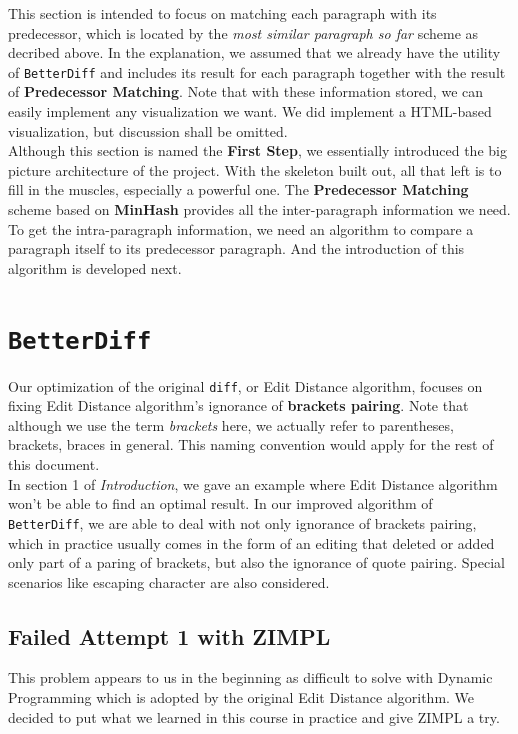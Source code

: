 \documentclass{article}
\begin{document}
This section is intended to focus on matching each paragraph with its predecessor, which is located by the \textit{most similar paragraph so far} scheme as decribed above. In the explanation, we assumed that we already have the utility of \texttt{BetterDiff} and includes its result for each paragraph together with the result of \textbf{Predecessor Matching}. Note that with these information stored, we can easily implement any visualization we want. We did implement a HTML-based visualization, but discussion shall be omitted. \\

Although this section is named the \textbf{First Step}, we essentially introduced the big picture architecture of the project. With the skeleton built out, all that left is to fill in the muscles, especially a powerful one. The \textbf{Predecessor Matching} scheme based on \textbf{MinHash} provides all the inter-paragraph information we need. To get the intra-paragraph information, we need an algorithm to compare a paragraph itself to its predecessor paragraph. And the introduction of this algorithm is developed next.

\pagebreak
\section{\texttt{BetterDiff}}
Our optimization of the original \texttt{diff}, or Edit Distance algorithm, focuses on fixing Edit Distance algorithm's ignorance of \textbf{brackets pairing}. Note that although we use the term \textit{brackets} here, we actually refer to parentheses, brackets, braces in general. This naming convention would apply for the rest of this document. \\

In section 1 of \textit{Introduction}, we gave an example where Edit Distance algorithm won't be able to find an optimal result. In our improved algorithm of \texttt{BetterDiff}, we are able to deal with not only ignorance of brackets pairing, which in practice usually comes in the form of an editing that deleted or added only part of a paring of brackets, but also the ignorance of quote pairing. Special scenarios like escaping character are also considered.

\subsection{Failed Attempt 1 with ZIMPL}
This problem appears to us in the beginning as difficult to solve with Dynamic Programming which is adopted by the original Edit Distance algorithm. We decided to put what we learned in this course in practice and give ZIMPL a try. \\
\end{document}
